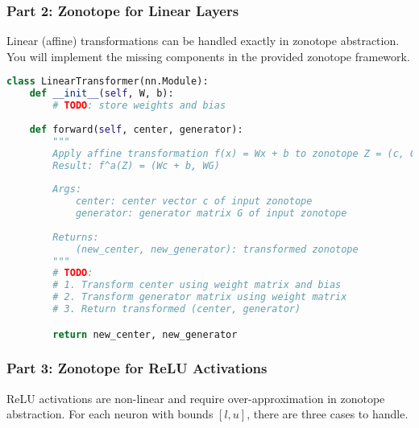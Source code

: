 \subsubsection{Part 2: Zonotope for Linear Layers}
Linear (affine) transformations can be handled exactly in zonotope abstraction. You will implement the missing components in the provided zonotope framework.

\begin{lstlisting}[language=Python]
class LinearTransformer(nn.Module):
    def __init__(self, W, b):
        # TODO: store weights and bias
    
    def forward(self, center, generator):
        """
        Apply affine transformation f(x) = Wx + b to zonotope Z = (c, G)
        Result: f^a(Z) = (Wc + b, WG)
        
        Args:
            center: center vector c of input zonotope
            generator: generator matrix G of input zonotope  
            
        Returns:
            (new_center, new_generator): transformed zonotope
        """
        # TODO: 
        # 1. Transform center using weight matrix and bias
        # 2. Transform generator matrix using weight matrix 
        # 3. Return transformed (center, generator)

        return new_center, new_generator

    \end{lstlisting}


\subsubsection{Part 3: Zonotope for ReLU Activations}

ReLU activations are non-linear and require over-approximation in zonotope abstraction. For each neuron with bounds $[l, u]$, there are three cases to handle.

